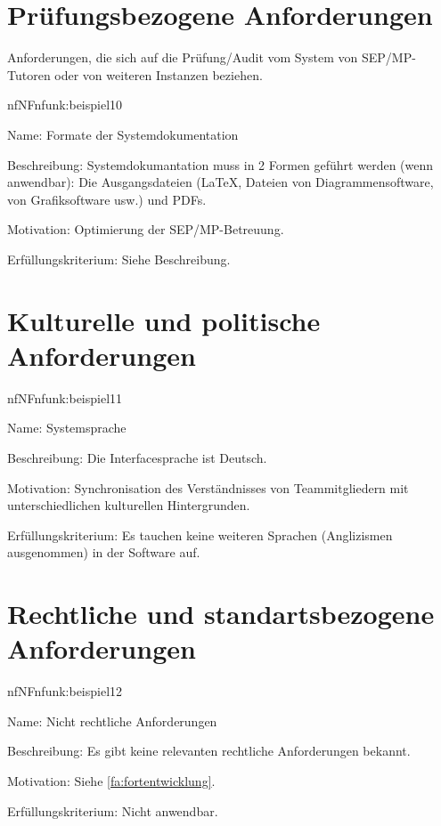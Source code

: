 \section{Prüfungsbezogene Anforderungen}

Anforderungen, die sich auf die Prüfung/Audit vom System von SEP/MP-Tutoren oder von weiteren Instanzen beziehen.


\begin{description}[leftmargin=5em, style=sameline]	
	\begin{lhp}{nf}{NF}{nfunk:beispiel10}
		\item [Name:] Formate der Systemdokumentation
		\item [Beschreibung:] Systemdokumantation muss in 2 Formen geführt werden (wenn anwendbar): Die Ausgangsdateien (\LaTeX, Dateien von Diagrammensoftware, von Grafiksoftware usw.) und PDFs.
		\item [Motivation:] Optimierung der SEP/MP-Betreuung.
		\item [Erfüllungskriterium:] Siehe Beschreibung.
	\end{lhp}
\end{description}

\section{Kulturelle und politische Anforderungen}


\begin{description}[leftmargin=5em, style=sameline]	
	\begin{lhp}{nf}{NF}{nfunk:beispiel11}
		\item [Name:] Systemsprache
		\item [Beschreibung:] Die Interfacesprache ist Deutsch.
		\item [Motivation:] Synchronisation des Verständnisses von Teammitgliedern mit unterschiedlichen kulturellen Hintergrunden.
		\item [Erfüllungskriterium:] Es tauchen keine weiteren Sprachen (Anglizismen ausgenommen) in der Software auf.
	\end{lhp}
\end{description}

\section{Rechtliche und standartsbezogene Anforderungen}


\begin{description}[leftmargin=5em, style=sameline]	
	\begin{lhp}{nf}{NF}{nfunk:beispiel12}
		\item [Name:] Nicht rechtliche Anforderungen
		\item [Beschreibung:] Es gibt keine relevanten rechtliche Anforderungen bekannt.
		\item [Motivation:] Siehe \ref{fa:fortentwicklung}.
		\item [Erfüllungskriterium:] Nicht anwendbar.
	\end{lhp}
\end{description}
